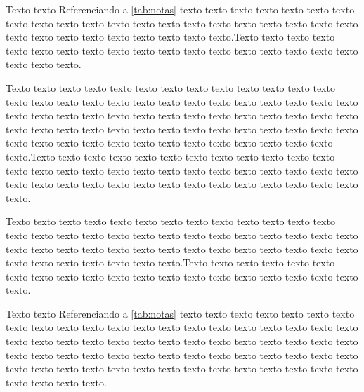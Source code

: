  Texto texto Referenciando a \autoref{tab:notas}  texto texto texto texto texto texto texto texto texto texto texto texto texto texto texto texto texto texto texto texto texto texto texto texto texto texto texto texto texto texto.Texto texto texto texto texto texto texto texto texto texto texto texto texto texto texto texto texto texto texto texto texto.

Texto texto texto texto texto texto texto texto texto texto texto texto texto texto texto texto texto texto texto texto texto texto texto texto texto texto texto texto texto texto texto texto texto texto texto texto texto texto texto texto texto texto texto texto texto texto texto texto texto texto texto texto texto texto texto texto texto texto texto texto texto texto texto texto texto texto texto texto texto.Texto texto texto texto texto texto texto texto texto texto texto texto texto texto texto texto texto texto texto texto texto texto texto texto texto texto texto texto texto texto texto texto texto texto texto texto texto texto texto texto texto.

Texto texto texto texto texto texto texto texto texto texto texto texto texto texto texto texto texto texto texto texto texto texto texto texto texto texto texto texto texto texto texto texto texto texto texto texto texto texto texto texto texto texto texto texto texto texto texto texto.Texto texto texto texto texto texto texto texto texto texto texto texto texto texto texto texto texto texto texto texto texto.

Texto texto  Referenciando a \autoref{tab:notas}  texto texto texto texto texto texto texto texto texto texto texto texto texto texto texto texto texto texto texto texto texto texto texto texto texto texto texto texto texto texto texto texto texto texto texto texto texto texto texto texto texto texto texto texto texto texto texto texto texto texto texto texto texto texto texto texto texto texto texto texto texto texto texto texto texto texto texto.